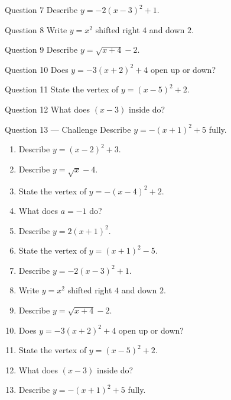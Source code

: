\documentclass[11pt]{article}
\begin{document}
\begin{qbox}{Question 7}
Describe $y=-2(x-3)^2+1$.\workspace{2.4cm}
\end{qbox}

\begin{qbox}{Question 8}
Write $y=x^2$ shifted right $4$ and down $2$.\workspace{2.4cm}
\end{qbox}

\begin{qbox}{Question 9}
Describe $y=\sqrt{x+4}-2$.\workspace{2.4cm}
\end{qbox}

\begin{qbox}{Question 10}
Does $y=-3(x+2)^2+4$ open up or down?\workspace{2.4cm}
\end{qbox}

\begin{qbox}{Question 11}
State the vertex of $y=(x-5)^2+2$.\workspace{2.4cm}
\end{qbox}

\begin{qbox}{Question 12}
What does $(x-3)$ inside do?\workspace{2.4cm}
\end{qbox}

\begin{qbox}{Question 13 --- Challenge}
Describe $y=-(x+1)^2+5$ fully.\workspace{3cm}
\end{qbox}

\clearpage
{}

\begin{recapbox}
\begin{multicols}{2}
\small
\begin{enumerate}[leftmargin=*,itemsep=3pt]
  \item Describe $y=(x-2)^2+3$.
  \item Describe $y=\sqrt{x}-4$.
  \item State the vertex of $y=-(x-4)^2+2$.
  \item What does $a=-1$ do?
  \item Describe $y=2(x+1)^2$.
  \item State the vertex of $y=(x+1)^2-5$.
  \item Describe $y=-2(x-3)^2+1$.
  \item Write $y=x^2$ shifted right $4$ and down $2$.
  \item Describe $y=\sqrt{x+4}-2$.
  \item Does $y=-3(x+2)^2+4$ open up or down?
  \item State the vertex of $y=(x-5)^2+2$.
  \item What does $(x-3)$ inside do?
  \item Describe $y=-(x+1)^2+5$ fully.
\end{enumerate}
\end{multicols}
\end{recapbox}
\end{document}
